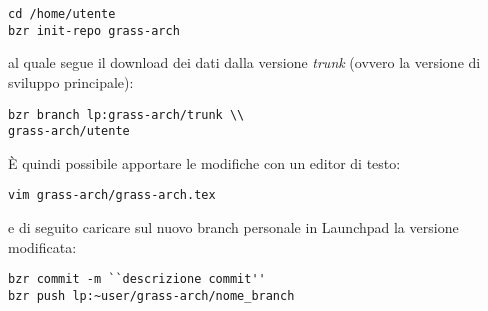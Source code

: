 \documentclass{article}
\begin{document}
\begin{multicols}{2}
\begin{lstlisting}
cd /home/utente
bzr init-repo grass-arch
\end{lstlisting}

al quale segue il download dei dati dalla versione \emph{trunk} (ovvero la versione di sviluppo principale):

\begin{lstlisting}
bzr branch lp:grass-arch/trunk \\
grass-arch/utente
\end{lstlisting}

È quindi possibile apportare le modifiche con un editor di testo:

\begin{lstlisting}
vim grass-arch/grass-arch.tex
\end{lstlisting}

e di seguito caricare sul nuovo branch personale in Launchpad la versione modificata:

\begin{lstlisting}
bzr commit -m ``descrizione commit''
bzr push lp:~user/grass-arch/nome_branch
\end{lstlisting}

	\end{multicols}

	\pagebreak
\end{document}
